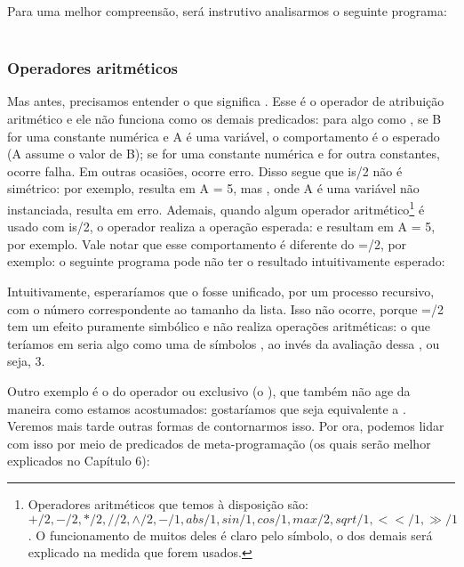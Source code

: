\documentclass{article}
\begin{document}
Para uma melhor compreensão, será instrutivo analisarmos o seguinte programa:
\\
\\


\label{lst:length}

\subsubsection{Operadores aritméticos}

Mas antes, precisamos entender o que significa . Esse  é o operador de atribuição aritmético e ele não funciona como os demais predicados: para algo como , se B for uma constante numérica e A é uma variável, o comportamento é o esperado (A assume o valor de B); se  for uma constante numérica e  for outra constantes, ocorre falha. Em outras ocasiões, ocorre erro.
Disso segue que is/2 não é simétrico: por exemplo,  resulta em A = 5, mas ,
onde A é uma variável não instanciada, resulta em erro. Ademais, quando algum
operador aritmético\footnote{Operadores aritméticos que temos à disposição são: $+/2, -/2, */2, //2, \wedge/2, -/1, abs/1, sin/1, cos/1, max/2, sqrt/1, <</1, \gg/1$. O funcionamento de muitos deles é claro pelo símbolo, o dos demais será explicado na medida que forem usados.}  é usado com is/2, o operador realiza a operação esperada:  e  resultam em A = 5, por exemplo. Vale notar que esse comportamento é diferente do =/2, por exemplo: o seguinte
programa pode não ter o resultado intuitivamente esperado:



\noindent Intuitivamente, esperaríamos que o  fosse unificado, por um processo recursivo, com o número correspondente ao tamanho da lista. Isso não ocorre, porque =/2 tem um efeito puramente simbólico e não realiza operações aritméticas: o que teríamos em  seria algo como uma  de símbolos , ao invés da avaliação dessa , ou seja, 3.

Outro exemplo é o do operador ou exclusivo (o ), que também  não age da maneira como estamos acostumados: gostaríamos que  seja equivalente a .
Veremos mais tarde outras formas de contornarmos isso. Por ora, podemos lidar com isso por meio de predicados de meta-programação
(os quais serão melhor explicados no Capítulo 6):
\end{document}

